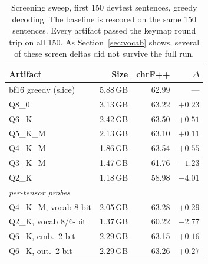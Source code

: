 \documentclass[10pt,twocolumn]{article}
\begin{document}
\begin{table}[t]
\centering\small
\setlength{\tabcolsep}{5pt}
\begin{tabular}{lrrr}
\toprule
Artifact & Size & chrF++ & $\Delta$ \\
\midrule
bf16 greedy (slice) & 5.88\,GB & 62.99 & --- \\
Q8\_0            & 3.13\,GB & 63.22 & $+0.23$ \\
Q6\_K            & 2.42\,GB & 63.50 & $+0.51$ \\
Q5\_K\_M         & 2.13\,GB & 63.10 & $+0.11$ \\
Q4\_K\_M         & 1.86\,GB & 63.54 & $+0.55$ \\
Q3\_K\_M         & 1.47\,GB & 61.76 & $-1.23$ \\
Q2\_K            & 1.18\,GB & 58.98 & $-4.01$ \\
\midrule
\multicolumn{4}{l}{\emph{per-tensor probes}}\\
Q4\_K\_M, vocab 8-bit  & 2.05\,GB & 63.28 & $+0.29$ \\
Q2\_K, vocab 8/6-bit   & 1.37\,GB & 60.22 & $-2.77$ \\
Q6\_K, emb.\ 2-bit & 2.29\,GB & 63.15 & $+0.16$ \\
Q6\_K, out.\ 2-bit & 2.29\,GB & 63.26 & $+0.27$ \\
\bottomrule
\end{tabular}
\caption{Screening sweep, first 150 devtest sentences, greedy decoding.
The baseline is rescored on the same 150 sentences. Every artifact
passed the keymap round trip on all 150. As Section~\ref{sec:vocab}
shows, several of these screen deltas did not survive the full run.}
\label{tab:screen}
\end{table}
\end{document}
